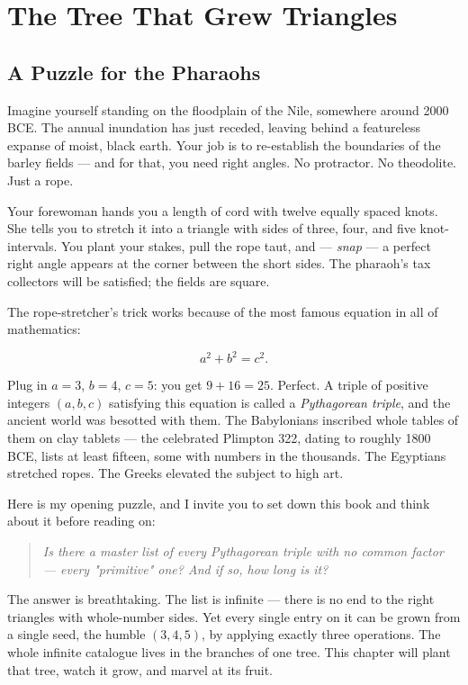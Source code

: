 \documentclass[11pt,twoside,openright]{book}
\theoremstyle{definition}
\theoremstyle{remark}
\begin{document}
\chapter{The Tree That Grew Triangles}



\section{A Puzzle for the Pharaohs}

Imagine yourself standing on the floodplain of the Nile, somewhere around 2000 BCE. The annual inundation has just receded, leaving behind a featureless expanse of moist, black earth. Your job is to re-establish the boundaries of the barley fields --- and for that, you need right angles. No protractor. No theodolite. Just a rope.

Your forewoman hands you a length of cord with twelve equally spaced knots. She tells you to stretch it into a triangle with sides of three, four, and five knot-intervals. You plant your stakes, pull the rope taut, and --- \textit{snap} --- a perfect right angle appears at the corner between the short sides. The pharaoh's tax collectors will be satisfied; the fields are square.


The rope-stretcher's trick works because of the most famous equation in all of mathematics:

\[a^2 + b^2 = c^2.\]

Plug in $a = 3$, $b = 4$, $c = 5$: you get $9 + 16 = 25$. Perfect. A triple of positive integers $(a, b, c)$ satisfying this equation is called a \textit{Pythagorean triple}, and the ancient world was besotted with them. The Babylonians inscribed whole tables of them on clay tablets --- the celebrated Plimpton 322, dating to roughly 1800 BCE, lists at least fifteen, some with numbers in the thousands. The Egyptians stretched ropes. The Greeks elevated the subject to high art.

Here is my opening puzzle, and I invite you to set down this book and think about it before reading on:

\begin{quote}
\textit{Is there a master list of every Pythagorean triple with no common factor --- every "primitive" one? And if so, how long is it?}
\end{quote}
The answer is breathtaking. The list is infinite --- there is no end to the right triangles with whole-number sides. Yet every single entry on it can be grown from a single seed, the humble $(3, 4, 5)$, by applying exactly three operations. The whole infinite catalogue lives in the branches of one tree. This chapter will plant that tree, watch it grow, and marvel at its fruit.
\end{document}
